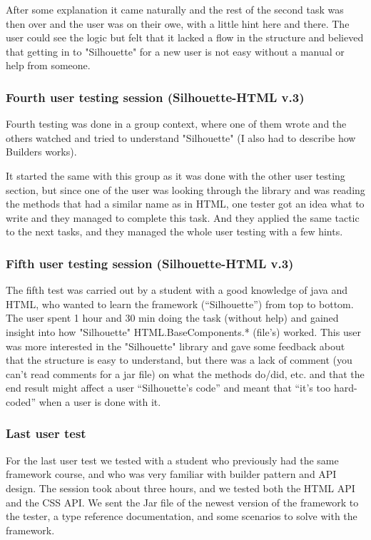 \documentclass[12pt]{article}
\begin{document}
        After some explanation it came naturally and the rest of the second task was then over and the user was on their owe, with a little hint here and there. The user could see the logic but felt that it lacked a flow in the structure and believed that getting in to "Silhouette" for a new user is not easy without a manual or help from someone.
        
        \subsubsection{Fourth user testing session (Silhouette-HTML v.3)}

        Fourth testing was done in a group context, where one of them wrote and the others watched and tried to understand "Silhouette" (I also had to describe how Builders works).

        It started the same with this group as it was done with the other user testing section, but since one of the user was looking through the library and was reading the methods that had a similar name as in HTML, one tester got an idea what to write and they managed to complete this task. And they applied the same tactic to the next tasks, and they managed the whole user testing with a few hints. 

        \subsubsection{Fifth user testing session (Silhouette-HTML v.3)}

        The fifth test was carried out by a student with a good knowledge of java and HTML, who wanted to learn the framework (“Silhouette”) from top to bottom. The user spent 1 hour and 30 min doing the task (without help) and gained insight into how "Silhouette" HTML.BaseComponents.* (file's) worked. This user was more interested in the "Silhouette" library and gave some feedback about that the structure is easy to understand, but there was a lack of comment (you can't read comments for a jar file) on what the methods do/did, etc. and that the end result might affect a user “Silhouette’s code” and meant that “it’s too hard-coded” when a user is done with it.

        \subsubsection{Last user test}

        For the last user test we tested with a student who previously had the same framework course, and who was very familiar with builder pattern and API design. The session took about three hours, and we tested both the HTML API and the CSS API. We sent the Jar file of the newest version of the framework to the tester, a type reference documentation, and some scenarios to solve with the framework.
\end{document}
